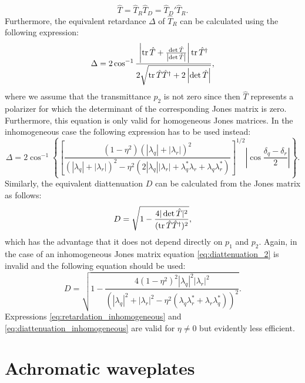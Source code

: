 \begin{equation}
    \hat{T} = \hat{T}_R\hat{T}_D = \hat{T}_D'\hat{T}_R.
\end{equation}
Furthermore, the equivalent retardance $\Delta$ of $\hat{T}_R$ can be calculated using the following expression:
\begin{equation}
    \Delta = 2 \cos^{-1} \frac{\left|\operatorname{tr}\hat{T}+\frac{\det \hat{T}}{\left|\det \hat{T}\right|} \right|\operatorname{tr} \hat{T}^{\dagger}}{2\sqrt{\operatorname{tr} \hat{T}\hat{T}^{\dagger}+2\left|\det \hat{T}\right|}},
\end{equation}
where we assume that the transmittance $p_2$ is not zero since then $\hat{T}$ represents a polarizer for which the determinant of the corresponding Jones matrix is zero. Furthermore, this equation is only valid for homogeneous Jones matrices. In the inhomogeneous case the following expression has to be used instead:
\begin{equation}
    \label{eq:retardation_inhomogeneous}
    \Delta = 2\cos^{-1}\left\{\left[\frac{(1-\eta^2)(|\lambda_q|+|\lambda_r|)^2}
    {(|\lambda_q|+|\lambda_r|)^2-\eta^2(2|\lambda_q||\lambda_r|+\lambda_q^*\lambda_r+\lambda_q\lambda_r^*)}\right]^{1/2}\left|\cos \frac{\delta_q-\delta_r}{2}\right|\right\}.
\end{equation}
Similarly, the equivalent diattenuation $D$ can be calculated from the Jones matrix as follows:
\begin{equation}
    \label{eq:diattenuation_2}
    D=\sqrt{1-\frac{4|\det \hat{T}|^2}{(\operatorname{tr} \hat{T}\hat{T}^{\dagger})^2}},
\end{equation}
which has the advantage that it does not depend directly on $p_1$ and $p_2$. Again, in the case of an inhomogeneous Jones matrix equation \ref{eq:diattenuation_2} is invalid and the following equation should be used:
\begin{equation}
    \label{eq:diattenuation_inhomogeneous}
    D=\sqrt{1- \frac{4(1-\eta^2)^2|\lambda_q|^2|\lambda_r|^2}
    {\left(|\lambda_q|^2+|\lambda_r|^2-\eta^2(\lambda_q\lambda_r^*+\lambda_r\lambda_q^*)\right)^2}}.
\end{equation}
Expressions \ref{eq:retardation_inhomogeneous} and \ref{eq:diattenuation_inhomogeneous} are valid for $\eta \neq 0$ but evidently less efficient. 




\section{Achromatic waveplates}
\label{sec:design}
